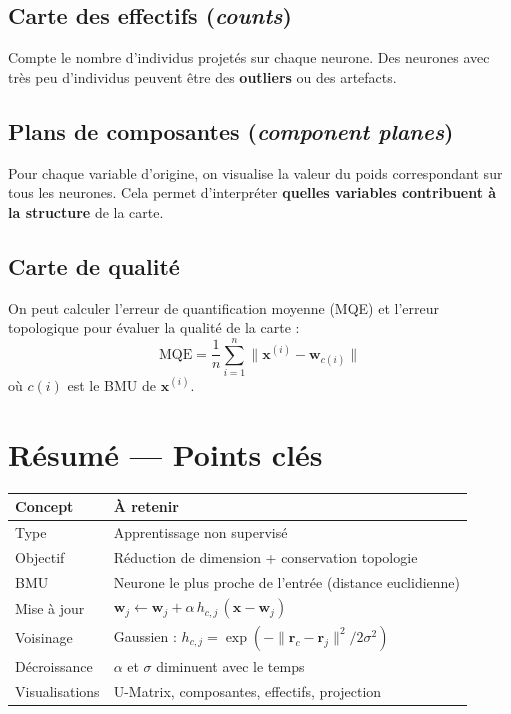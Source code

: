 \documentclass[a4paper,11pt]{article}
\theoremstyle{definition}
\begin{document}
\subsection{Carte des effectifs (\textit{counts})}
Compte le nombre d'individus projetés sur chaque neurone. Des neurones avec très peu d'individus peuvent être des \textbf{outliers} ou des artefacts.

\subsection{Plans de composantes (\textit{component planes})}
Pour chaque variable d'origine, on visualise la valeur du poids correspondant sur tous les neurones. Cela permet d'interpréter \textbf{quelles variables contribuent à la structure} de la carte.

\subsection{Carte de qualité}
On peut calculer l'erreur de quantification moyenne (MQE) et l'erreur topologique pour évaluer la qualité de la carte :
\[
\text{MQE} = \frac{1}{n}\sum_{i=1}^{n} \|\mathbf{x}^{(i)} - \mathbf{w}_{c(i)}\|
\]
où $c(i)$ est le BMU de $\mathbf{x}^{(i)}$.

\section{Résumé — Points clés}

\begin{center}
\begin{tabular}{lp{10cm}}
\toprule
\textbf{Concept} & \textbf{À retenir} \\
\midrule
Type & Apprentissage non supervisé \\
Objectif & Réduction de dimension + conservation topologie \\
BMU & Neurone le plus proche de l'entrée (distance euclidienne) \\
Mise à jour & $\mathbf{w}_j \leftarrow \mathbf{w}_j + \alpha \, h_{c,j} \, (\mathbf{x} - \mathbf{w}_j)$ \\
Voisinage & Gaussien : $h_{c,j} = \exp(-\| \mathbf{r}_c - \mathbf{r}_j\|^2 / 2\sigma^2)$ \\
Décroissance & $\alpha$ et $\sigma$ diminuent avec le temps \\
Visualisations & U-Matrix, composantes, effectifs, projection \\
\bottomrule
\end{tabular}
\end{center}
\end{document}

